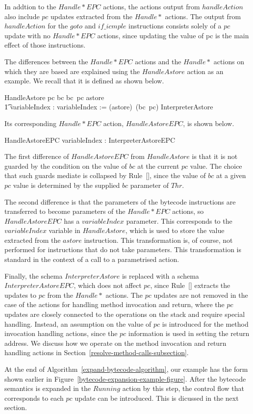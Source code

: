 In addtion to the $Handle{*}EPC$ actions, the actions output from
$handleAction$ also include $pc$ updates extracted from the $Handle*$
actions.
The output from $handleAction$ for the $goto$ and $if\_icmple$
instructions consists solely of a $pc$ update with no $Handle{*}EPC$
actions, since updating the value of pc is the main effect of those
instructions.

The differences between the $Handle{*}EPC$ actions and the $Handle*$
actions on which they are based are explained using the $HandleAstore$
action as an example.
We recall that it is defined as shown below.
\begin{circusaction}
  HandleAstore \circdef \lcircguard pc \in \dom bc \land bc~pc \in \ran astore \rcircguard \circguard \\
  \t1 \circvar variableIndex : \nat \circspot variableIndex := (astore\inv)~(bc~pc) \circseq \lschexpract InterpreterAstore \rschexpract
\end{circusaction}
Its corresponding $Handle{*}EPC$ action, $HandleAstoreEPC$, is shown
below.
\begin{circusaction}
  HandleAstoreEPC \circdef \circval variableIndex : \nat \circspot \lschexpract InterpreterAstoreEPC \rschexpract
\end{circusaction}
The first difference of $HandleAstoreEPC$ from $HandleAstore$ is that
it is not guarded by the condition on the value of $bc$ at the current
$pc$ value.
The choice that such guards mediate is collapsed by
Rule~[], since the value of
$bc$ at a given $pc$ value is determined by the supplied $bc$
parameter of $Thr$.

The second difference is that the parameters of the bytecode
instructions are transferred to become parameters of the
$Handle{*}EPC$ actions, so $HandleAstoreEPC$ has a $variableIndex$
parameter.
This corresponds to the $variableIndex$ variable in $HandleAstore$,
which is used to store the value extracted from the $astore$
instruction.
This transformation is, of course, not performed for instructions that
do not take parameters.
This transformation is standard in the context of a call to a
parametrised action.

Finally, the schema $InterpreterAstore$ is replaced with a schema
$InterpreterAstoreEPC$, which does not affect $pc$, since
Rule~[] extracts the
updates to $pc$ from the $Handle{*}$ actions.
The $pc$ updates are not removed in the case of the actions for
handling method invocation and return, where the $pc$ updates are
closely connected to the operations on the stack and require special
handling.
Instead, an assumption on the value of $pc$ is introduced for the
method invocation handling actions, since the $pc$ information is used
in setting the return address.
We discuss how we operate on the method invocation and return handling
actions in Section~\ref{resolve-method-calls-subsection}.

At the end of Algorithm~\ref{expand-bytecode-algorithm}, our example
has the form shown earlier in
Figure~\ref{bytecode-expansion-example-figure}.
After the bytecode semantics is expanded in the $Running$ action by
this step, the control flow that corresponds to each $pc$ update can
be introduced.
This is dicussed in the next section.